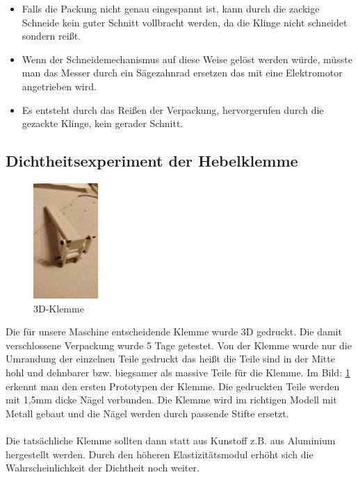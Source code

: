 \begin{itemize}
\item Falls die Packung nicht genau eingespannt ist, kann durch die zackige Schneide kein guter Schnitt vollbracht werden, da die Klinge nicht schneidet sondern reißt.
\item Wenn der Schneidemechanismus auf diese Weise gelöst werden würde, müsste man das Messer durch ein Sägezahnrad ersetzen das mit eine Elektromotor angetrieben wird.
\item Es entsteht durch das Reißen der Verpackung, hervorgerufen durch die gezackte Klinge, kein gerader Schnitt.
\end{itemize}


\subsection{Dichtheitsexperiment der Hebelklemme}

\begin{figure}
\vspace{-10pt}
  \begin{center}
    \includegraphics[width=0.22\textwidth]{Bilder/Dichtheitsexperiment/Klemme}
  \end{center}
  \caption{3D-Klemme}
  \label{3D-Klemme}
  \vspace{-20pt}
\end{figure}

Die für unsere Maschine entscheidende Klemme wurde 3D gedruckt. Die damit verschlossene Verpackung wurde 5 Tage getestet. Von der Klemme wurde nur die Umrandung der einzelnen Teile gedruckt das heißt die Teile sind in der Mitte hohl und dehnbarer bzw. biegsamer als massive Teile für die Klemme. Im Bild: \ref{3D-Klemme} erkennt man den ersten Prototypen der Klemme. Die gedruckten Teile werden mit 1,5mm dicke Nägel verbunden. Die Klemme wird im richtigen Modell mit Metall gebaut und die Nägel werden durch passende Stifte ersetzt.\\\\ 
Die tatsächliche Klemme sollten dann statt aus Kunstoff z.B. aus Aluminium hergestellt werden. Durch den höheren Elastizitätsmodul erhöht sich die Wahrscheinlichkeit der Dichtheit noch weiter.

